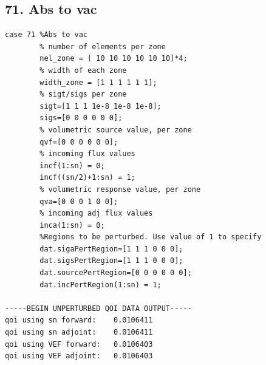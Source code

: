 \documentclass{article}
\begin{document}
\subsection{71. Abs to vac}
\begin{verbatim}
case 71 %Abs to vac
        % number of elements per zone
        nel_zone = [ 10 10 10 10 10 10]*4;
        % width of each zone
        width_zone = [1 1 1 1 1 1];
        % sigt/sigs per zone
        sigt=[1 1 1 1e-8 1e-8 1e-8];
        sigs=[0 0 0 0 0 0];
        % volumetric source value, per zone
        qvf=[0 0 0 0 0 0];
        % incoming flux values
        incf(1:sn) = 0;
        incf((sn/2)+1:sn) = 1;
        % volumetric response value, per zone
        qva=[0 0 0 1 0 0];
        % incoming adj flux values
        inca(1:sn) = 0;
        %Regions to be perturbed. Use value of 1 to specify
        dat.sigaPertRegion=[1 1 1 0 0 0];
        dat.sigsPertRegion=[1 1 1 0 0 0];
        dat.sourcePertRegion=[0 0 0 0 0 0];
        dat.incPertRegion(1:sn) = 1;   
        
-----BEGIN UNPERTURBED QOI DATA OUTPUT----- 
qoi using sn forward: 	 0.0106411 
qoi using sn adjoint: 	 0.0106411 
qoi using VEF forward: 	 0.0106403 
qoi using VEF adjoint: 	 0.0106403 
\end{verbatim}
\end{document}
